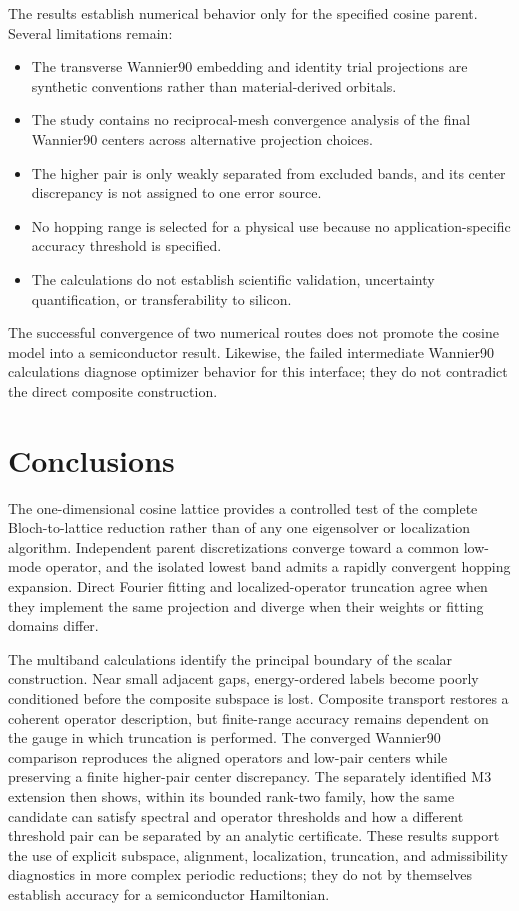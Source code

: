 The results establish numerical behavior only for the specified cosine parent.
Several limitations remain:
\begin{itemize}
    \item The transverse Wannier90 embedding and identity trial projections are
          synthetic conventions rather than material-derived orbitals.
    \item The study contains no reciprocal-mesh convergence analysis of the
          final Wannier90 centers across alternative projection choices.
    \item The higher pair is only weakly separated from excluded bands, and its
          center discrepancy is not assigned to one error source.
    \item No hopping range is selected for a physical use because no
          application-specific accuracy threshold is specified.
    \item The calculations do not establish scientific validation,
          uncertainty quantification, or transferability to silicon.
\end{itemize}
The successful convergence of two numerical routes does not promote the cosine
model into a semiconductor result. Likewise, the failed intermediate Wannier90
calculations diagnose optimizer behavior for this interface; they do not
contradict the direct composite
construction.

\section{Conclusions}

The one-dimensional cosine lattice provides a controlled test of the complete
Bloch-to-lattice reduction rather than of any one eigensolver or localization
algorithm. Independent parent discretizations converge toward a common
low-mode operator, and the isolated lowest band admits a rapidly convergent hopping
expansion. Direct Fourier fitting and localized-operator truncation agree when
they implement the same projection and diverge when their weights or fitting
domains differ.

The multiband calculations identify the principal boundary of the scalar
construction. Near small adjacent gaps, energy-ordered labels become poorly
conditioned before the composite subspace is lost. Composite transport restores
a coherent operator description, but finite-range accuracy remains dependent on
the gauge in which truncation is performed. The converged Wannier90 comparison
reproduces the aligned operators and low-pair centers while preserving a finite
higher-pair center discrepancy. The separately identified M3 extension then
shows, within its bounded rank-two family, how the same candidate can satisfy
spectral and operator thresholds and how a different threshold pair can be
separated by an analytic certificate. These results support the use of explicit
subspace, alignment, localization, truncation, and admissibility diagnostics in
more complex periodic reductions; they do not by themselves establish accuracy
for a semiconductor Hamiltonian.

